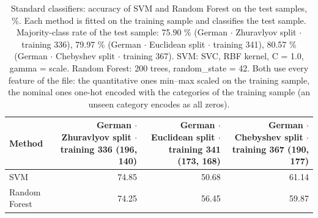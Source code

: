 \begin{table}[htbp]
  \centering
  \caption{Standard classifiers: accuracy of SVM and Random Forest on the test samples, \%. Each method is fitted on the training sample and classifies the test sample. Majority-class rate of the test sample: 75.90 \% (German $\cdot$ Zhuravlyov split $\cdot$ training 336), 79.97 \% (German $\cdot$ Euclidean split $\cdot$ training 341), 80.57 \% (German $\cdot$ Chebyshev split $\cdot$ training 367). SVM: SVC, RBF kernel, C = 1.0, gamma = scale. Random Forest: 200 trees, random\_state = 42. Both use every feature of the file: the quantitative ones min--max scaled on the training sample, the nominal ones one-hot encoded with the categories of the training sample (an unseen category encodes as all zeros).}
  \label{tab:standard-classifiers}
  \begin{tabular}{lrrr}
    \toprule
    Method & German $\cdot$ Zhuravlyov split $\cdot$ training 336 (196, 140) & German $\cdot$ Euclidean split $\cdot$ training 341 (173, 168) & German $\cdot$ Chebyshev split $\cdot$ training 367 (190, 177) \\
    \midrule
    SVM & 74.85 & 50.68 & 61.14 \\
    Random Forest & 74.25 & 56.45 & 59.87 \\
    \bottomrule
  \end{tabular}
\end{table}
